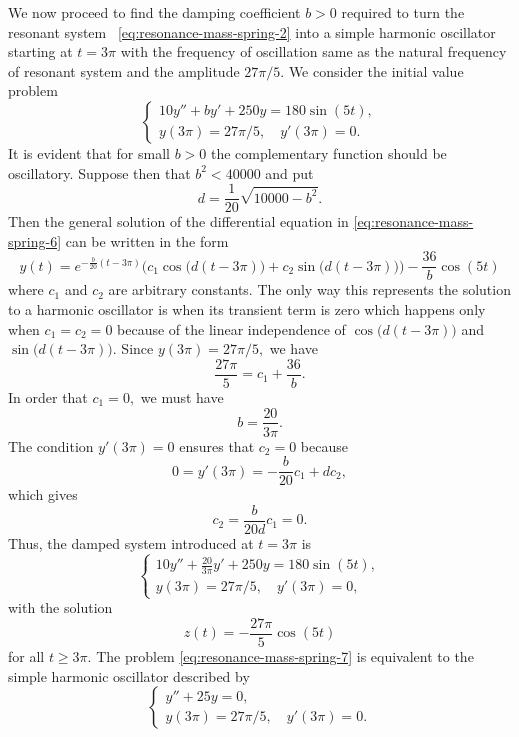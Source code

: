 \begin{solution}
	We now proceed to find the damping coefficient $b>0$ required to turn the resonant system ~\ref{eq:resonance-mass-spring-2}  into a simple harmonic oscillator starting at $t=3\pi$  with the  frequency of oscillation same as the natural frequency of resonant system and the amplitude $27\pi/5.$
We consider the initial value problem
	\begin{equation}\label{eq:resonance-mass-spring-6}
	\begin{cases}
		10y''+by' +250 y = 180 \sin(5t),\\
		y(3\pi)  ={27\pi}/{5}, \quad y'(3\pi)  = 0.
	\end{cases}
	\end{equation}
It is evident that for small $b>0$ the complementary function should be oscillatory. Suppose then that $b^2< 40000$ and put 
\[d = \frac{1}{20}\sqrt{10000-b^2}.\]
Then the general solution of the differential equation  in \eqref{eq:resonance-mass-spring-6}   can be written in the form
\[ y(t) =e^{-\frac{b}{20}(t-3\pi)} \Big(c_1 \cos\big(d(t-3\pi)\big)+c_2 \sin\big(d(t-3\pi)\big)\Big)-\frac{36}{b} \cos (5 t)\]	
where $c_1$ and $c_2$ are arbitrary constants.  The only way this represents the solution to a harmonic oscillator is when its transient term is zero which happens only when $c_1=c_2= 0$ because of the linear independence of $\cos\big(d (t-3\pi)\big)$ and $\sin\big(d (t-3\pi)\big).$ 
Since $y(3\pi) = 27\pi/5,$ we have
\[\frac{27\pi}{5}  = c_1 +\frac{36}{b}.\] In order that $c_1=0,$ we must have \[b= \frac{20}{3\pi}.\]
The condition $y'(3\pi) = 0$ ensures that $c_2=0$ because
\[0 =y'(3\pi)= -\frac{b}{20} c_1 +dc_2,\] which gives
\[c_2 = \frac{b}{20d} c_1 =0.\]
Thus, the damped  system introduced at $t  = 3\pi$ is 
\begin{equation}\label{eq:resonance-mass-spring-7}
	\begin{cases}
		10y''+\frac{20}{3\pi}y' +250 y = 180 \sin(5 t),\\
		y(3\pi)  ={27\pi}/{5}, \quad y'(3\pi)  = 0,
	\end{cases}
\end{equation}
with the solution 
\[z(t) = -\frac{27\pi}{5} \cos (5 t)\] for all $t\ge 3\pi.$ The problem \eqref{eq:resonance-mass-spring-7} is equivalent to the simple harmonic oscillator described by 
\begin{equation}\label{eq:resonance-mass-spring-8}
		\begin{cases}
			y''+25 y = 0,\\
			y(3\pi)  ={27\pi}/{5}, \quad y'(3\pi)  = 0.
		\end{cases}

\end{equation}
\end{solution}

